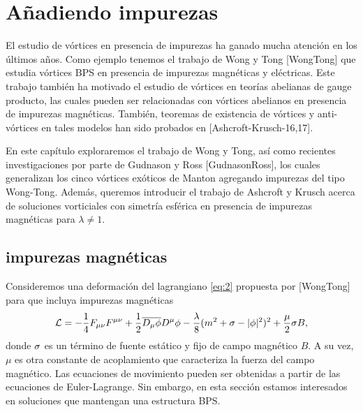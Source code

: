 
\chapter{Añadiendo impurezas} %

\label{ch:impurities} %


El estudio de vórtices en presencia de impurezas ha ganado mucha atención en los últimos años. Como ejemplo tenemos el trabajo de Wong y Tong [WongTong] que estudia vórtices BPS en presencia de impurezas magnéticas y eléctricas. Este trabajo también ha motivado el estudio de vórtices en teorías abelianas de gauge producto, las cuales pueden ser relacionadas con vórtices abelianos en presencia de impurezas magnéticas. También, teoremas de existencia de vórtices y anti-vórtices en tales modelos han sido probados en [Ashcroft-Krusch-16,17].

En este capítulo exploraremos el trabajo de Wong y Tong, así como recientes investigaciones por parte de Gudnason y Ross [GudnasonRoss], los cuales generalizan los cinco vórtices exóticos de Manton agregando impurezas del tipo Wong-Tong. Además, queremos introducir el trabajo de Ashcroft y Krusch acerca de soluciones vorticiales con simetría esférica en presencia de impurezas magnéticas para $\lambda\neq 1$.

\section{impurezas magnéticas}

Consideremos una deformación del lagrangiano \eqref{eq:2} propuesta por [WongTong] para que incluya impurezas magnéticas
\begin{align}
	\mathcal{L} = -\frac{1}{4} F_{\mu\nu}F^{\mu\nu}+\frac{1}{2}\overline{D_\mu\phi}D^\mu\phi-\frac{\lambda}{8}(m^2+\sigma-|\phi|^2)^2+\frac{\mu}{2}\sigma B, \label{eq:7.1.0.1}
\end{align}
donde $\sigma$ es un término de fuente estático y fijo de campo magnético $B$. A su vez, $\mu$ es otra constante de acoplamiento que caracteriza la fuerza del campo magnético. Las ecuaciones de movimiento pueden ser obtenidas a partir de las ecuaciones de Euler-Lagrange. Sin embargo, en esta sección estamos interesados en soluciones que mantengan una estructura BPS.

